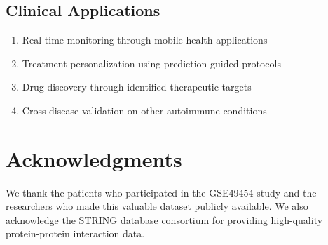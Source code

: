 \documentclass[10pt,twocolumn]{article}
\begin{document}
\subsection{Clinical Applications}
\begin{enumerate}
\item Real-time monitoring through mobile health applications
\item Treatment personalization using prediction-guided protocols
\item Drug discovery through identified therapeutic targets
\item Cross-disease validation on other autoimmune conditions
\end{enumerate}

\section*{Acknowledgments}

We thank the patients who participated in the GSE49454 study and the researchers who made this valuable dataset publicly available. We also acknowledge the STRING database consortium for providing high-quality protein-protein interaction data.



\end{document}
